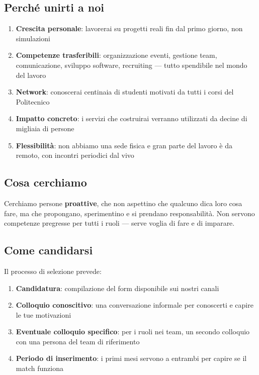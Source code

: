 \documentclass[letter]{polinetwork}
\begin{document}
\subsection{Perché unirti a noi}

\begin{enumerate}[leftmargin=2em]
	\item \textbf{Crescita personale}: lavorerai su progetti reali
	      fin dal primo giorno, non simulazioni
	\item \textbf{Competenze trasferibili}: organizzazione eventi,
	      gestione team, comunicazione, sviluppo software, recruiting
	      — tutto spendibile nel mondo del lavoro
	\item \textbf{Network}: conoscerai centinaia di studenti
	      motivati da tutti i corsi del Politecnico
	\item \textbf{Impatto concreto}: i servizi che costruirai
	      verranno utilizzati da decine di migliaia di persone
	\item \textbf{Flessibilità}: non abbiamo una sede fisica e gran
	      parte del lavoro è da remoto, con incontri periodici
	      dal vivo
\end{enumerate}

\subsection{Cosa cerchiamo}

Cerchiamo persone \textbf{proattive}, che non aspettino che qualcuno
dica loro cosa fare, ma che propongano, sperimentino e si prendano
responsabilità. Non servono competenze pregresse per tutti i ruoli
— serve voglia di fare e di imparare.

\subsection{Come candidarsi}

Il processo di selezione prevede:
\begin{enumerate}[leftmargin=2em]
	\item \textbf{Candidatura}: compilazione del form disponibile
	      sui nostri canali
	\item \textbf{Colloquio conoscitivo}: una conversazione informale
	      per conoscerti e capire le tue motivazioni
	\item \textbf{Eventuale colloquio specifico}: per i ruoli nei
	      team, un secondo colloquio con una persona del team
	      di riferimento
	\item \textbf{Periodo di inserimento}: i primi mesi servono a
	      entrambi per capire se il match funziona
\end{enumerate}
\end{document}
